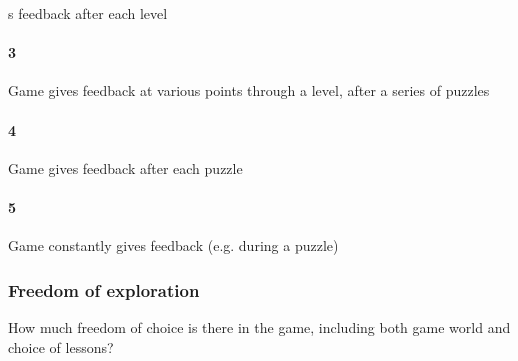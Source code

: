 s feedback after each level\paragraph{3}Game gives feedback at various points through a level, after a series of puzzles\paragraph{4}Game gives feedback after each puzzle\paragraph{5}Game constantly gives feedback (e.g. during a puzzle)\subsubsection{Freedom of exploration}How much freedom of choice is there in the game, including both game world and choice of lessons?\para